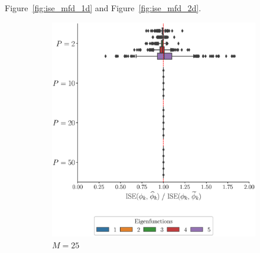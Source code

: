 \begin{results}

Figure~\ref{fig:ise_mfd_1d} and Figure~\ref{fig:ise_mfd_2d}.

\begin{figure}
     \centering
     \begin{subfigure}[b]{0.49\textwidth}
         \centering
         \includegraphics[width=\textwidth]{figures/scenario_1/ise_N50_M25.eps}
         \caption{$M = 25$}
         \label{fig:ise_mfd_1d_25}
     \end{subfigure}
     \hfill
     \begin{subfigure}[b]{0.49\textwidth}
         \centering

\end{subfigure}
\end{figure}
\end{results}
